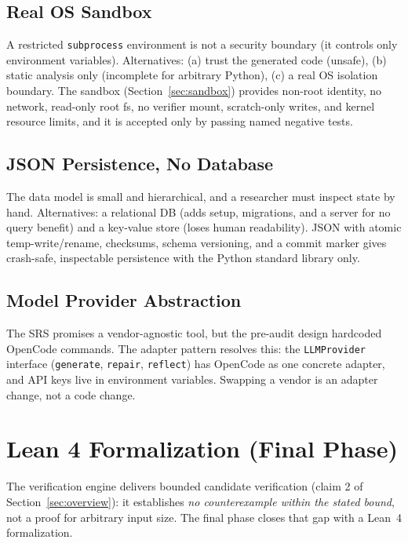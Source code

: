 \documentclass[12pt,a4paper]{article}
\begin{document}
\subsection{Real OS Sandbox}

A restricted \texttt{subprocess} environment is not a security boundary (it controls only environment variables). Alternatives: (a) trust the generated code (unsafe), (b) static analysis only (incomplete for arbitrary Python), (c) a real OS isolation boundary. The sandbox (Section~\ref{sec:sandbox}) provides non-root identity, no network, read-only root fs, no verifier mount, scratch-only writes, and kernel resource limits, and it is accepted only by passing named negative tests.

\subsection{JSON Persistence, No Database}

The data model is small and hierarchical, and a researcher must inspect state by hand. Alternatives: a relational DB (adds setup, migrations, and a server for no query benefit) and a key-value store (loses human readability). JSON with atomic temp-write/rename, checksums, schema versioning, and a commit marker gives crash-safe, inspectable persistence with the Python standard library only.

\subsection{Model Provider Abstraction}
\label{sec:provider}

The SRS promises a vendor-agnostic tool, but the pre-audit design hardcoded OpenCode commands. The adapter pattern resolves this: the \texttt{LLMProvider} interface (\texttt{generate}, \texttt{repair}, \texttt{reflect}) has OpenCode as one concrete adapter, and API keys live in environment variables. Swapping a vendor is an adapter change, not a code change.

\section{Lean 4 Formalization (Final Phase)}
\label{sec:lean}

The verification engine delivers bounded candidate verification (claim 2 of Section~\ref{sec:overview}): it establishes \emph{no counterexample within the stated bound}, not a proof for arbitrary input size. The final phase closes that gap with a Lean~4 formalization.
\end{document}
